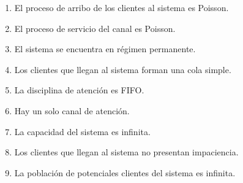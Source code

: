 \documentclass[a4paper,11pt]{article}
\begin{document}
\leftskip=36pt
\parindent=-18pt
\begin{enumerate}[1.]
  \item El proceso de arribo de los clientes al sistema es Poisson.
  \item El proceso de servicio del canal es Poisson.
  \item El sistema se encuentra en régimen permanente.
  \item Los clientes que llegan al sistema forman una cola simple.
  \item La disciplina de atención es FIFO.
  \item Hay un solo canal de atención.
  \item La capacidad del sistema es infinita.
  \item Los clientes que llegan al sistema no presentan impaciencia.
  \item La población de potenciales clientes del sistema es infinita.
\end{enumerate}
\end{document}
